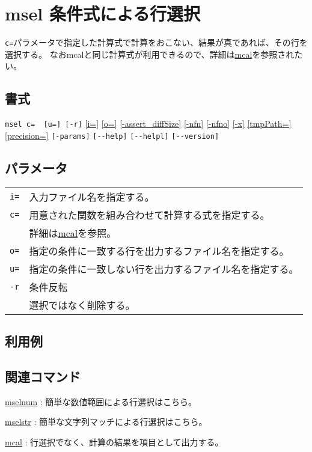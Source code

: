 
%

\section{msel 条件式による行選択\label{sect:msel}}
\verb|c=|パラメータで指定した計算式で計算をおこない、結果が真であれば、その行を選択する。
なおmcalと同じ計算式が利用できるので、詳細は\hyperref[sect:mcal]{mcal}を参照されたい。

\subsection*{書式}
\verb|msel c=  [u=] [-r]|
\hyperref[sect:option_i]{[i=]}
\hyperref[sect:option_o]{[o=]}
\hyperref[sect:option_assert_diffSize]{[-assert\_diffSize]}
\hyperref[sect:option_nfn]{[-nfn]} 
\hyperref[sect:option_nfno]{[-nfno]}  
\hyperref[sect:option_x]{[-x]}
\hyperref[sect:option_option_tmppath]{[tmpPath=]}
\hyperref[sect:option_precision]{[precision=]}
\verb|[-params]|
\verb|[--help]|
\verb|[--helpl]|
\verb|[--version]|\\


\subsection*{パラメータ}
\begin{table}[htbp]
{\small
\begin{tabular}{ll}
\verb|i=|    & 入力ファイル名を指定する。\\
\verb|c=|    & 用意された関数を組み合わせて計算する式を指定する。\\
             & 詳細は\hyperref[sect:mcal]{mcal}を参照。 \\
\verb|o=|    & 指定の条件に一致する行を出力するファイル名を指定する。 \\
\verb|u=|    & 指定の条件に一致しない行を出力するファイル名を指定する。\\
\verb|-r|    & 条件反転\\
             & 選択ではなく削除する。\\
\end{tabular} 
}
\end{table} 

\subsection*{利用例}

\subsection*{関連コマンド}
\hyperref[sect:mselnum]{mselnum} : 簡単な数値範囲による行選択はこちら。

\hyperref[sect:mselstr]{mselstr} : 簡単な文字列マッチによる行選択はこちら。

\hyperref[sect:mcal]{mcal} : 行選択でなく、計算の結果を項目として出力する。

%
